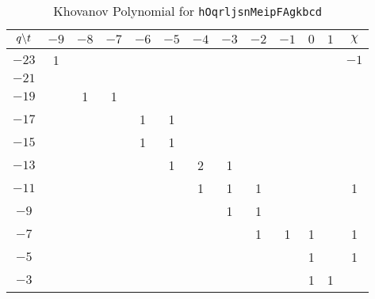 \begin{table}
    \centering
    \begin{tabular}{| c | c | c | c | c | c | c | c | c | c | c | c | c |}
        \hline
        $q\symbol{92}t$&$-9$&$-8$&$-7$&$-6$&$-5$&$-4$&$-3$&$-2$&$-1$&$0$&$1$&$\chi$\\
        \hline
        $-23$&1&&&&&&&&&&&$-1$\\
        \hline
        $-21$&&&&&&&&&&&&\\
        \hline
        $-19$&&1&1&&&&&&&&&\\
        \hline
        $-17$&&&&1&1&&&&&&&\\
        \hline
        $-15$&&&&1&1&&&&&&&\\
        \hline
        $-13$&&&&&1&2&1&&&&&\\
        \hline
        $-11$&&&&&&1&1&1&&&&1\\
        \hline
        $-9$&&&&&&&1&1&&&&\\
        \hline
        $-7$&&&&&&&&1&1&1&&1\\
        \hline
        $-5$&&&&&&&&&&1&&1\\
        \hline
        $-3$&&&&&&&&&&1&1&\\
        \hline
    \end{tabular}
    \caption{Khovanov Polynomial for \texttt{hOqrljsnMeipFAgkbcd}}
\end{table}
